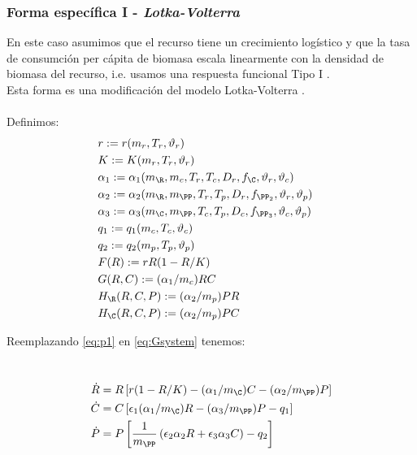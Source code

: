 \subsubsection{Forma espec\'ifica I - \emph{Lotka-Volterra}}
En este caso asumimos que el recurso tiene un crecimiento log\'istico y que la tasa de consumci\'on per c\'apita de biomasa escala linearmente con la densidad de biomasa del recurso, i.e. usamos una respuesta funcional Tipo I \citep{gotelliprimer}.\\
Esta forma es una modificaci\'on del modelo Lotka-Volterra \citep{gotelliprimer}.\\
\mbox{}\\
Definimos:
\begin{equation}\label{eq:p1}
\begin{aligned}
&r := r(m_r,T_r,\vartheta_r)&\\ 
&K := K(m_r,T_r,\vartheta_r)&\\
&\alpha_{1} := \alpha_{1}(m_\R,m_c,T_r,T_c,D_r,f_\C,\vartheta_r,\vartheta_c)&\\
&\alpha_{2} := \alpha_{2}(m_\R,m_\PP,T_r,T_p,D_r,f_{\PP_2},\vartheta_r,\vartheta_p)&\\
&\alpha_{3} := \alpha_{3}(m_\C,m_\PP,T_c,T_p,D_c,f_{\PP_3},\vartheta_c,\vartheta_p)& \\
&q_1 := q_1(m_c,T_c,\vartheta_c)& \\ 
&q_2 := q_2(m_p,T_p,\vartheta_p)&\\
&F(R):= rR(1-R/K)& \\
&G(R,C):= (\alpha_1/m_c)RC &\\ 
&H_{\R}(R,C,P):= (\alpha_2/m_p)PR&\\
&H_{\C}(R,C,P):= (\alpha_2/m_p)PC&
\end{aligned}
\end{equation}

Reemplazando \eqref{eq:p1} en \eqref{eq:Gsystem} tenemos:

\
\begin{equation}
\begin{aligned} 
\dot{R} &= R\left[r(1-R/K)- (\alpha_{1}/m_\C) C -(\alpha_{2}/m_\PP) P \right] \\
\dot{C} &= C \left[\epsilon_1 (\alpha_{1}/m_\C) R - (\alpha_{3} /m_\PP) P - q_1\right] \\
\dot{P} &= P \left[\frac{1}{m_\PP}\left(\epsilon_2 \alpha_{2}R + \epsilon_3 \alpha_{3}C \right) - q_2 \right]
\end{aligned}
\end{equation}

